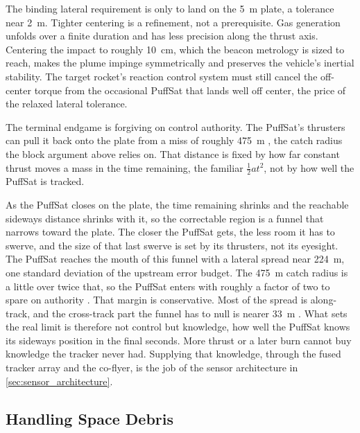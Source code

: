 \documentclass{article}
\begin{document}
The binding lateral requirement is only to land on the \SI{5}{\meter} plate, a tolerance near \SI{2}{\meter}.  Tighter centering is a refinement, not a prerequisite. Gas generation unfolds over a finite duration and has less precision along the thrust axis. Centering the impact to roughly \SI{10}{\centi\meter}, which the beacon metrology is sized to reach, makes the plume impinge symmetrically and preserves the vehicle's inertial stability. The target rocket's reaction control system must still cancel the off-center torque from the occasional PuffSat that lands well off center, the price of the relaxed lateral tolerance.

The terminal endgame is forgiving on control authority. The PuffSat's thrusters can pull it back onto the plate from a miss of roughly \SI{475}{\meter} \cite{Katz_puffsat_control_sim_2026}, the catch radius the block argument above relies on. That distance is fixed by how far constant thrust moves a mass in the time remaining, the familiar $\tfrac{1}{2}a t^2$, not by how well the PuffSat is tracked.

As the PuffSat closes on the plate, the time remaining shrinks and the reachable sideways distance shrinks with it, so the correctable region is a funnel that narrows toward the plate. The closer the PuffSat gets, the less room it has to swerve, and the size of that last swerve is set by its thrusters, not its eyesight. The PuffSat reaches the mouth of this funnel with a lateral spread near \SI{224}{\meter}, one standard deviation of the upstream error budget. The \SI{475}{\meter} catch radius is a little over twice that, so the PuffSat enters with roughly a factor of two to spare on authority \cite{Katz_puffsat_control_sim_2026}. That margin is conservative. Most of the spread is along-track, and the cross-track part the funnel has to null is nearer \SI{33}{\meter} \cite{Katz_puffsat_control_sim_2026}. What sets the real limit is therefore not control but knowledge, how well the PuffSat knows its sideways position in the final seconds. More thrust or a later burn cannot buy knowledge the tracker never had. Supplying that knowledge, through the fused tracker array and the co-flyer, is the job of the sensor architecture in \autoref{sec:sensor_architecture}.

\subsection{Handling Space Debris} \label{sec:handling_space_debris}
\end{document}
